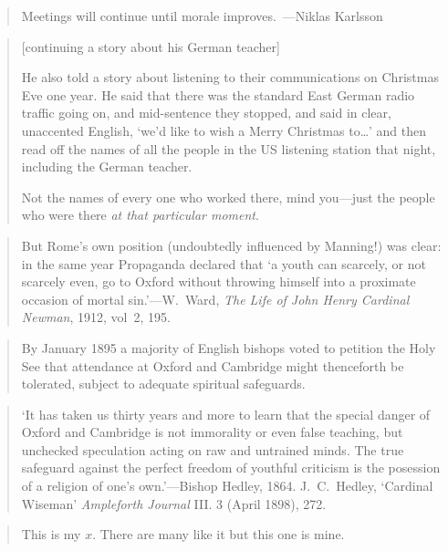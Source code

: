 \documentclass[a4paper]{article}
\begin{document}
\medskip
\begin{quote}
	Meetings will continue until morale improves.~---Niklas Karlsson
\end{quote}

\medskip
\begin{quote}
	[continuing a story about his German teacher]

	He also told a story about listening to their communications on
	Christmas Eve one year. He said that there was the standard East German
	radio traffic going on, and mid-sentence they stopped, and said in clear,
	unaccented English, `we'd like to wish a Merry Christmas to\ldots' and
	then read off the names of all the people in the US listening station
	that night, including the German teacher.  

	Not the names of every one who worked there, mind you---just the people
	who were there \emph{at that particular moment}.~\cite{joshdish2008}
\end{quote}

\medskip
\begin{quote}
	But Rome's own position (undoubtedly influenced by Manning!) was clear:
	in the same year Propaganda declared that `a youth can scarcely, or not
	scarcely even, go to Oxford without throwing himself into a proximate
	occasion of mortal sin.'---W.~Ward, \emph{The Life of John Henry Cardinal
	Newman}, 1912, vol~2, 195.
\end{quote}

\medskip
\begin{quote}
	By January 1895 a majority of English bishops voted to petition the Holy
	See that attendance at Oxford and Cambridge might thenceforth be tolerated,
	subject to adequate spiritual safeguards.~\cite{Stacpoole1986}
\end{quote}

\medskip
\begin{quote}
	`It has taken us thirty years and more to learn that the special danger
	of Oxford and Cambridge is not immorality or even false teaching, but
	unchecked speculation acting on raw and untrained minds.  The true
	safeguard against the perfect freedom of youthful criticism is the
	posession of a religion of one's own.'---Bishop Hedley, 1864.  J.~C.~Hedley,
	`Cardinal Wiseman' \emph{Ampleforth Journal} III.  3 (April 1898), 272.
\end{quote}

\medskip
\begin{quote}
	This is my $x$.  There are many like it but this one is mine.
\end{quote}
\end{document}
